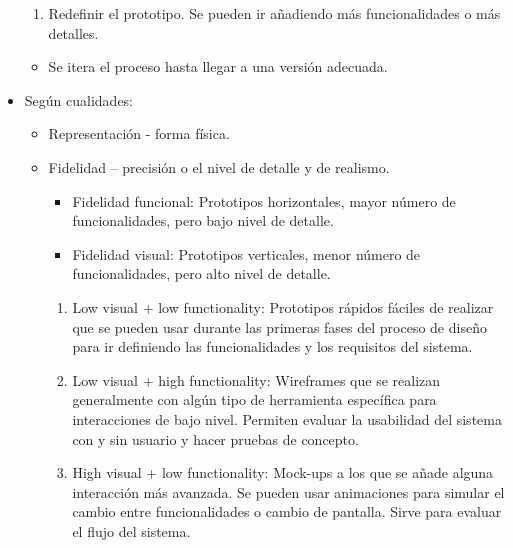 \documentclass[12pt, twoside, openright]{report} %
\begin{document}
\begin{itemize}
\begin{enumerate}
		      \item Redefinir el prototipo. Se pueden ir añadiendo más
		            funcionalidades o más detalles.
	      \end{enumerate}

	      \begin{itemize}
		      \item Se itera el proceso hasta llegar a una versión adecuada.
	      \end{itemize}
	      \pagebreak
	\item Según cualidades:

	      \begin{itemize}
		      \item Representación - forma física.

		      \item Fidelidad -- precisión o el nivel de detalle y de realismo.

		            \begin{itemize}
			            \item Fidelidad funcional: Prototipos horizontales, mayor número de
			                  funcionalidades, pero bajo nivel de detalle.

			            \item Fidelidad visual: Prototipos verticales, menor número de
			                  funcionalidades, pero alto nivel de detalle.
		            \end{itemize}

		            \begin{enumerate}
			            \def\labelenumi{\arabic{enumi}.}


			            \item Low visual + low functionality: Prototipos rápidos fáciles de
			                  realizar que se pueden usar durante las primeras fases del
			                  proceso de diseño para ir definiendo las funcionalidades y los
			                  requisitos del sistema.

			            \item Low visual + high functionality: Wireframes que se realizan
			                  generalmente con algún tipo de herramienta específica para
			                  interacciones de bajo nivel. Permiten evaluar la usabilidad
			                  del sistema con y sin usuario y hacer pruebas de concepto.

			            \item High visual + low functionality: Mock-ups a los que se añade
			                  alguna interacción más avanzada. Se pueden usar animaciones
			                  para simular el cambio entre funcionalidades o cambio de
			                  pantalla. Sirve para evaluar el flujo del sistema.


\end{enumerate}
\end{itemize}
\end{itemize}
\end{document}
